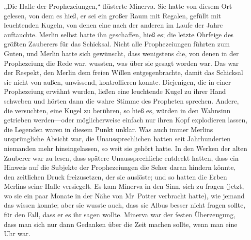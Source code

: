 „Die Halle der Prophezeiungen,“ flüsterte Minerva. Sie hatte von diesem Ort gelesen, von dem es hieß, er sei ein großer Raum mit Regalen, gefüllt mit leuchtenden Kugeln, von denen eine nach der anderen im Laufe der Jahre auftauchte. Merlin selbst hatte ihn geschaffen, hieß es; die letzte Ohrfeige des größten Zauberers für das Schicksal. Nicht alle Prophezeiungen führten zum Guten, und Merlin hatte sich gewünscht, dass wenigstens die, von denen in der Prophezeiung die Rede war, wussten, was über sie gesagt worden war. Das war der Respekt, den Merlin dem freien Willen entgegenbrachte, damit das Schicksal sie nicht von außen, unwissend, kontrollieren konnte. Diejenigen, die in einer Prophezeiung erwähnt wurden, ließen eine leuchtende Kugel zu ihrer Hand schweben und hörten dann die wahre Stimme des Propheten sprechen. Andere, die versuchten, eine Kugel zu berühren, so hieß es, würden in den Wahnsinn getrieben werden—oder möglicherweise einfach nur ihren Kopf explodieren lassen, die Legenden waren in diesem Punkt unklar. Was auch immer Merlins ursprüngliche Absicht war, die Unaussprechlichen hatten seit Jahrhunderten niemanden mehr hineingelassen, so weit sie gehört hatte. In den Werken der alten Zauberer war zu lesen, dass spätere Unaussprechliche entdeckt hatten, dass ein Hinweis auf die Subjekte der Prophezeiungen die Seher daran hindern könnte, den zeitlichen Druck freizusetzen, der sie auslöste; und so hatten die Erben Merlins seine Halle versiegelt. Es kam Minerva in den Sinn, sich zu fragen (jetzt, wo sie ein paar Monate in der Nähe von Mr~Potter verbracht hatte), wie jemand das wissen konnte; aber sie wusste auch, dass sie Albus besser nicht fragen sollte, für den Fall, dass er es ihr sagen wollte. Minerva war der festen Überzeugung, dass man sich nur dann Gedanken über die Zeit machen sollte, wenn man eine Uhr war.

